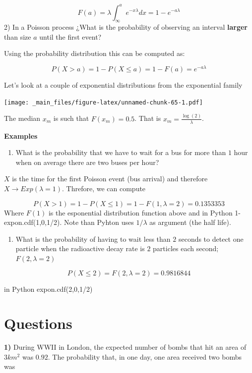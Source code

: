 \documentclass[
]{book}
\providecommand{\tightlist}{%
  \setlength{\itemsep}{0pt}\setlength{\parskip}{0pt}}
\begin{document}
\[F(a)=\lambda \int_\infty^a e^{-x\lambda}dx=1-e^{-a\lambda}\]
2) In a Poisson process ¿What is the probability of observing an interval \textbf{larger} than size \(a\) until the first event?

Using the probability distribution this can be computed as:

\[P(X > a)=1- P(X \leq a)= 1- F(a) = e^{-a\lambda}\]

Let's look at a couple of exponential distributions from the exponential family

\texttt{[image: \_main\_files/figure-latex/unnamed-chunk-65-1.pdf]}

The median \(x_m\) is such that \(F(x_m)=0.5\). That is \(x_m=\frac{\log(2)}{\lambda}\).

\textbf{Examples}

\begin{enumerate}
\def\labelenumi{\arabic{enumi})}
\tightlist
\item
  What is the probability that we have to wait for a bus for more than \(1\) hour when on average there are two buses per hour?
\end{enumerate}

\(X\) is the time for the first Poisson event (bus arrival) and therefore \(X \rightarrow Exp(\lambda=1)\). Threfore, we can compute

\[P(X > 1)=1-P(X \le 1) = 1-F(1,\lambda=2)=0.1353353\]
Where \(F(1)\) is the esponential distribution function above and in Python 1-expon.cdf(1,0,1/2). Note than Pyhton uses \(1/\lambda\) as argument (the half life).

\begin{enumerate}
\def\labelenumi{\arabic{enumi})}
\setcounter{enumi}{1}
\tightlist
\item
  What is the probability of having to wait less than \(2\) seconds to detect one particle when the radioactive decay rate is \(2\) particles each second; \(F(2,\lambda=2)\)
\end{enumerate}

\[P(X \le 2)=F(2,\lambda=2)=0.9816844\]

in Python expon.cdf(2,0,1/2)

\hypertarget{questions-5}{%
\section{Questions}\label{questions-5}}

\textbf{1)} During WWII in London, the expected number of bombs that hit an area of \(3km^2\) was \(0.92\). The probability that, in one day, one area received two bombs was
\end{document}
